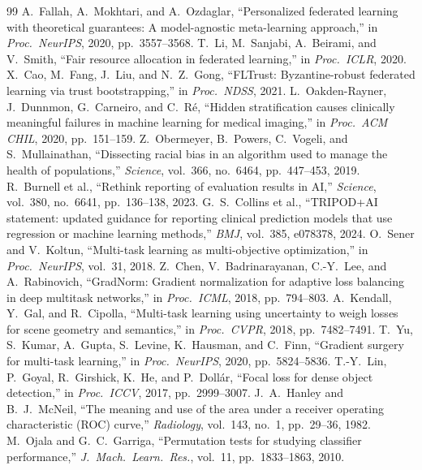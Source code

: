 \documentclass[conference]{IEEEtran}
\begin{document}
\begin{thebibliography}{99}
 A.~Fallah, A.~Mokhtari, and A.~Ozdaglar, ``Personalized federated learning with theoretical guarantees: A model-agnostic meta-learning approach,'' in \emph{Proc.\ NeurIPS}, 2020, pp.~3557--3568.
 T.~Li, M.~Sanjabi, A.~Beirami, and V.~Smith, ``Fair resource allocation in federated learning,'' in \emph{Proc.\ ICLR}, 2020.
 X.~Cao, M.~Fang, J.~Liu, and N.~Z.~Gong, ``FLTrust: Byzantine-robust federated learning via trust bootstrapping,'' in \emph{Proc.\ NDSS}, 2021.
 L.~Oakden-Rayner, J.~Dunnmon, G.~Carneiro, and C.~R\'e, ``Hidden stratification causes clinically meaningful failures in machine learning for medical imaging,'' in \emph{Proc.\ ACM CHIL}, 2020, pp.~151--159.
 Z.~Obermeyer, B.~Powers, C.~Vogeli, and S.~Mullainathan, ``Dissecting racial bias in an algorithm used to manage the health of populations,'' \emph{Science}, vol.~366, no.~6464, pp.~447--453, 2019.
 R.~Burnell et al., ``Rethink reporting of evaluation results in AI,'' \emph{Science}, vol.~380, no.~6641, pp.~136--138, 2023.
 G.~S.~Collins et al., ``TRIPOD+AI statement: updated guidance for reporting clinical prediction models that use regression or machine learning methods,'' \emph{BMJ}, vol.~385, e078378, 2024.
 O.~Sener and V.~Koltun, ``Multi-task learning as multi-objective optimization,'' in \emph{Proc.\ NeurIPS}, vol.~31, 2018.
 Z.~Chen, V.~Badrinarayanan, C.-Y.~Lee, and A.~Rabinovich, ``GradNorm: Gradient normalization for adaptive loss balancing in deep multitask networks,'' in \emph{Proc.\ ICML}, 2018, pp.~794--803.
 A.~Kendall, Y.~Gal, and R.~Cipolla, ``Multi-task learning using uncertainty to weigh losses for scene geometry and semantics,'' in \emph{Proc.\ CVPR}, 2018, pp.~7482--7491.
 T.~Yu, S.~Kumar, A.~Gupta, S.~Levine, K.~Hausman, and C.~Finn, ``Gradient surgery for multi-task learning,'' in \emph{Proc.\ NeurIPS}, 2020, pp.~5824--5836.
 T.-Y.~Lin, P.~Goyal, R.~Girshick, K.~He, and P.~Doll\'ar, ``Focal loss for dense object detection,'' in \emph{Proc.\ ICCV}, 2017, pp.~2999--3007.
 J.~A.~Hanley and B.~J.~McNeil, ``The meaning and use of the area under a receiver operating characteristic (ROC) curve,'' \emph{Radiology}, vol.~143, no.~1, pp.~29--36, 1982.
 M.~Ojala and G.~C.~Garriga, ``Permutation tests for studying classifier performance,'' \emph{J.\ Mach.\ Learn.\ Res.}, vol.~11, pp.~1833--1863, 2010.

\end{thebibliography}
\end{document}
